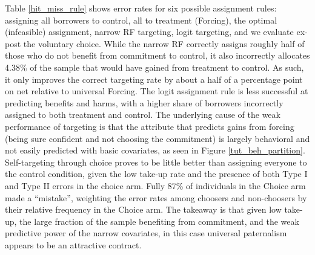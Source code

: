 \documentclass[oneside,11pt]{article}
\begin{document}
Table \ref{hit_miss_rule} shows error rates for six possible assignment rules: assigning all borrowers to control, all to treatment (Forcing), the optimal (infeasible) assignment, narrow RF targeting, logit targeting, and we evaluate ex-post the voluntary choice.  While the narrow RF correctly assigns roughly half of those who do not benefit from commitment to control, it also incorrectly allocates 4.38\% of the sample that would have gained from treatment to control. As such, it only improves the correct targeting rate by about a half of a percentage point on net relative to universal Forcing. The logit assignment rule is less successful at predicting benefits and harms, with a higher share of borrowers incorrectly assigned to both treatment and control. 
The underlying cause of the weak performance of targeting is that the attribute that predicts gains from forcing (being sure confident and not choosing the commitment) is largely behavioral and not easily predicted with basic covariates, as seen in Figure \ref{tut_beh_partition}. Self-targeting through choice proves to be little better than assigning everyone to the control condition, given the low take-up rate and the presence of both Type I and Type II errors in the choice arm. Fully 87\% of individuals in the Choice arm made a ``mistake'', weighting the error rates among choosers and non-choosers by their relative frequency in the Choice arm. The takeaway is that given low take-up, the large fraction of the sample benefiting from commitment, and the weak predictive power of the narrow covariates, in this case universal paternalism appears to be an attractive contract. 










\end{document}
